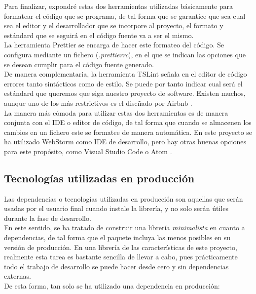  Para finalizar, expondré estas dos herramientas utilizadas básicamente para formatear el código que se programa, de tal forma que se garantice que sea cual sea el editor y el desarrollador que se incorpore al proyecto, el formato y estándard que se seguirá en el código fuente va a ser el mismo. \\
 
 La herramienta Prettier \cite{prettier} se encarga de hacer este formateo del código. Se configura mediante un fichero (\textit{.prettierrc}), en el que se indican las opciones que se desean cumplir para el código fuente generado. \\
 
 De manera complementaria, la herramienta TSLint \cite{tslint} señala en el editor de código errores tanto sintácticos como de estilo. Se puede por tanto indicar cual será el estándard que queremos que siga nuestro proyecto de software. Existen muchos, aunque uno de los más restrictivos es el diseñado por Airbnb \cite{airbnbjs}. \\
 
 La manera más cómoda para utilizar estas dos herramientas es de manera conjunta con el IDE o editor de código, de tal forma que cuando se almacenen los cambios en un fichero este se formatee de manera automática. En este proyecto se ha utilizado WebStorm \cite{webstorm} como IDE de desarrollo, pero hay otras buenas opciones para este propósito, como Visual Studio Code \cite{vscode} o Atom \cite{atom}.

\subsection{Tecnologías utilizadas en producción}

Las dependencias o tecnologías utilizadas en producción son aquellas que serán usadas por el usuario final cuando instale la librería, y no solo serán útiles durante la fase de desarrollo. \\

En este sentido, se ha tratado de construir una librería \textit{minimalista} en cuanto a dependencias, de tal forma que el paquete incluya las menos posibles en su versión de producción. En una librería de las características de este proyecto, realmente esta tarea es bastante sencilla de llevar a cabo, pues prácticamente todo el trabajo de desarrollo se puede hacer desde cero y sin dependencias externas.\\

De esta forma, tan solo se ha utilizado una dependencia en producción:

